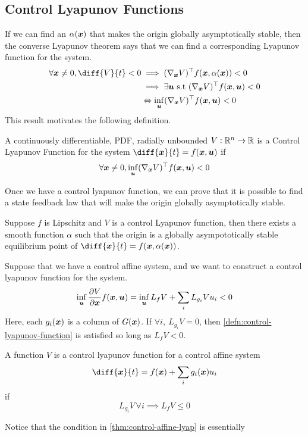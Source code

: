 \subsection{Control Lyapunov Functions}
If we can find an $\alpha(\boldsymbol{x})$ that makes the origin globally asymptotically
stable, then the converse Lyapunov theorem says that we can find a
corresponding Lyapunov function for the system.
\begin{align*}
	\forall \bs{x} \neq 0, \diff{V}{t} < 0 &\implies (\nabla_{\bs{x}}V)^\top f(\bs{x}, \alpha(\bs{x})) < 0 \\
	&\implies \exists \bs{u} \text{ s.t } (\nabla_{\bs{x}}V)^\top f(\bs{x},
	\bs{u}) < 0\\
	& \Leftrightarrow \inf_{\bs{u}} (\nabla_{\bs{x}}V)^\top f(\bs{x}, \bs{u}) < 0
\end{align*}
This result motivates the following definition.
\begin{definition}
	A continuously differentiable, PDF, radially unbounded $V: \mathbb{R}^n \to \mathbb{R}$ is a
	Control Lyapunov Function for the system $\diff{\bs{x}}{t} = f(\bs{x},
	\bs{u})$ if \[
		\forall \boldsymbol{x} \neq 0, \inf_{\boldsymbol{u}} (\nabla_{\boldsymbol{x}}V)^\top
		f(\boldsymbol{x}, \boldsymbol{u}) < 0
	\]
	\label{defn:control-lyapunov-function}
\end{definition}
Once we have a control lyapunov function, we can prove that it is possible to
find a state feedback law that will make the origin globally asymptotically
stable.
\begin{theorem}
	Suppose $f$ is Lipschitz and $V$ is a control Lyapunov function, then there
	exists a smooth function $\alpha$ such that the origin is a globally
	asympototically stable equilibrium point of $\diff{\bs{x}}{t} = f(\bs{x},
	\alpha(\bs{x}))$.
	\label{thm:artstein}
\end{theorem}
Suppose that we have a control affine system, and we want to construct a control
lyapunov function for the system. \[
	\inf_{\boldsymbol{u}} \frac{\partial V}{\partial \boldsymbol{x}}f(\boldsymbol{x}, \boldsymbol{u}) =
	\inf_{\boldsymbol{u}} L_f V + \sum_i L_{g_i} V u_i < 0
\]
Here, each $g_i(\boldsymbol{x})$ is a column of $G(\boldsymbol{x})$.
If $\forall i,\ L_{g_i} V = 0$, then \cref{defn:control-lyapunov-function} is
satisfied so long as $L_f V < 0$.
\begin{theorem}
	A function $V$ is a control lyapunov function for a control affine system \[
		\diff{\bs{x}}{t} = f(\bs{x}) + \sum_i g_i(\bs{x}) u_i
	\] if \[
		L_{g_i} V\, \forall i \implies L_f V \leq 0
	\]
	\label{thm:control-affine-lyap}
\end{theorem}
Notice that the condition in \cref{thm:control-affine-lyap} is essentially
